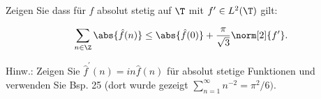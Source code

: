 
\begin{exercise}

Zeigen Sie dass für $f$ absolut stetig auf $\T$ mit $f^\prime \in L^2(\T)$ gilt:

\begin{align*}
    \sum_{n \in \Z}
    \abs{\hat f(n)}
    \leq
    \abs{\hat f(0)} + \frac{\pi}{\sqrt 3} \norm[2]{f^\prime}.
\end{align*}

Hinw.:
Zeigen Sie $\hat f^\prime(n) = i n \hat f(n)$ für absolut stetige Funktionen und verwenden Sie Bsp. 25 (dort wurde gezeigt $\sum_{n=1}^\infty n^{-2} = \pi^2 / 6)$.

\end{exercise}


